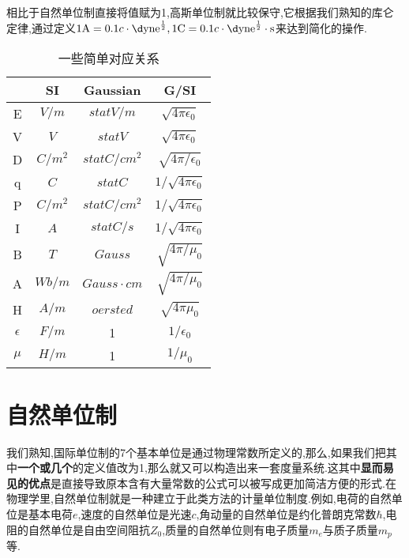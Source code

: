 \documentclass[lang=cn,newtx,10pt,scheme=chinese,thmcnt=section]{elegantbook}
\begin{document}
相比于自然单位制直接将值赋为1,高斯单位制就比较保守,它根据我们熟知的库仑定律,通过定义$1\mathrm{A}=0.1c\cdot\mathrm{\d yne}^{\frac12},1\mathrm{C}=0.1c\cdot\rm{\d yne}^{\frac12}\cdot s$来达到简化的操作.\\
\begin{table}[htbp]
	\centering
	\caption{一些简单对应关系}
	\begin{tabular}{|c|c|c|c|}
		\hline
		& SI      & Gaussian        & G/SI                     \\ \hline
		E          & $V/m$   & $statV/m$       & $\sqrt{4\pi\epsilon_0}$  \\ \hline
		V          & $V$     & $statV$         & $\sqrt{4\pi\epsilon_0}$  \\ \hline
		D          & $C/m^2$ & $statC/cm^2$    & $\sqrt{4\pi/\epsilon_0}$ \\ \hline
		q          & $C$     & $statC$         & $1/\sqrt{4\pi\epsilon_0}$ \\ \hline
		P          & $C/m^2$ & $statC/cm^2$    & $1/\sqrt{4\pi\epsilon_0}$ \\ \hline
		I          & $A$     & $statC/s$       & $1/\sqrt{4\pi\epsilon_0}$ \\ \hline
		B          & $T$     & $Gauss$         & $\sqrt{4\pi/\mu_0}$      \\ \hline
		A          & $Wb/m$  & $Gauss\cdot cm$ & $\sqrt{4\pi/\mu_0}$      \\ \hline
		H          & $A/m$   & $oersted$       & $\sqrt{4\pi\mu_0}$       \\ \hline
		$\epsilon$ & $F/m$   & 1               & $1/\epsilon_0$           \\ \hline
		$\mu$      & $H/m$   & 1               & $1/\mu_0$                \\ \hline
	\end{tabular}
\end{table}
\section{自然单位制}
我们熟知,国际单位制的7个基本单位是通过物理常数所定义的,那么,如果我们把其中\textbf{一个或几个}的定义值改为1,那么就又可以构造出来一套度量系统.这其中\textbf{显而易见的优点}是直接导致原本含有大量常数的公式可以被写成更加简洁方便的形式.在物理学里,自然单位制就是一种建立于此类方法的计量单位制度.例如,电荷的自然单位是基本电荷${\displaystyle e}$,速度的自然单位是光速${\displaystyle c}$,角动量的自然单位是约化普朗克常数${\displaystyle \hbar }$,电阻的自然单位是自由空间阻抗${\displaystyle Z_{0}}$,质量的自然单位则有电子质量${\displaystyle m_{e}}$与质子质量${\displaystyle m_{p}}$等.\\
\end{document}

